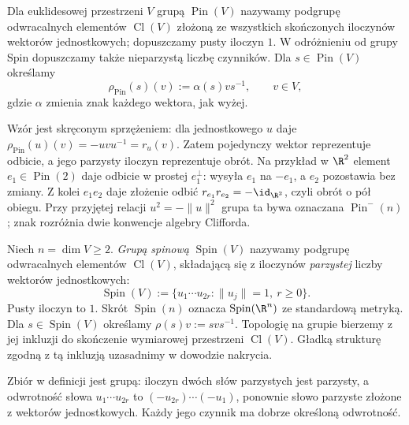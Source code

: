 \begin{definicja}
\label{def:lin31-pin-grupa}
Dla euklidesowej przestrzeni $V$ grupą $\operatorname{Pin}(V)$
nazywamy podgrupę odwracalnych elementów $\operatorname{Cl}(V)$
złożoną ze wszystkich skończonych iloczynów wektorów
jednostkowych; dopuszczamy pusty iloczyn $1$.
W odróżnieniu od grupy Spin dopuszczamy także nieparzystą
liczbę czynników. Dla $s\in\operatorname{Pin}(V)$ określamy
\[
 \rho_{\mathrm{Pin}}(s)(v):=\alpha(s)v s^{-1},
 \qquad v\in V,
\]
gdzie $\alpha$ zmienia znak każdego wektora, jak wyżej.
\end{definicja}

Wzór jest skręconym sprzężeniem: dla jednostkowego $u$
daje $\rho_{\mathrm{Pin}}(u)(v)=-uvu^{-1}=r_u(v)$.
Zatem pojedynczy wektor reprezentuje odbicie, a jego parzysty
iloczyn reprezentuje obrót. Na przykład w $\R^2$ element
$e_1\in\operatorname{Pin}(2)$ daje odbicie w prostej
$e_1^\perp$: wysyła $e_1$ na $-e_1$, a $e_2$ pozostawia
bez zmiany. Z kolei $e_1e_2$ daje złożenie odbić
$r_{e_1}r_{e_2}=-\id_{\R^2}$, czyli obrót o pół obiegu.
Przy przyjętej relacji $u^2=-\|u\|^2$ grupa ta bywa
oznaczana $\operatorname{Pin}^{-}(n)$; znak rozróżnia dwie
konwencje algebry Clifforda.

\begin{definicja}
\label{def:lin31-spin-grupa}
Niech $n=\dim V\geq2$. \emph{Grupą spinową}
$\operatorname{Spin}(V)$ nazywamy podgrupę
odwracalnych elementów $\operatorname{Cl}(V)$,
składającą się z iloczynów \emph{parzystej}
liczby wektorów jednostkowych:
\[
 \operatorname{Spin}(V)
 :=\{u_1\cdots u_{2r}:\|u_j\|=1,\ r\geq0\}.
\]
Pusty iloczyn to $1$. Skrót
$\operatorname{Spin}(n)$ oznacza
$\operatorname{Spin}(\R^n)$ ze standardową metryką.
Dla $s\in\operatorname{Spin}(V)$ określamy
$\rho(s)v:=svs^{-1}$.
Topologię na grupie bierzemy z jej inkluzji do skończenie
wymiarowej przestrzeni $\operatorname{Cl}(V)$. Gładką strukturę
zgodną z tą inkluzją uzasadnimy w dowodzie nakrycia.
\end{definicja}

Zbiór w definicji jest grupą: iloczyn dwóch słów
parzystych jest parzysty, a odwrotność słowa
$u_1\cdots u_{2r}$ to
$(-u_{2r})\cdots(-u_1)$, ponownie słowo parzyste
złożone z wektorów jednostkowych.
Każdy jego czynnik ma dobrze określoną odwrotność.

